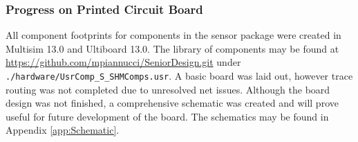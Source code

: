 \subsubsection{Progress on Printed Circuit Board}
All component footprints for components in the sensor package were created in Multisim 13.0 and Ultiboard 13.0.
The library of components may be found at \url{https://github.com/mpiannucci/SeniorDesign.git} under \verb|./hardware/UsrComp_S_SHMComps.usr|.
A basic board was laid out, however trace routing was not completed due to unresolved net issues.
Although the board design was not finished, a comprehensive schematic was created and will prove useful for future development of the board.
The schematics may be found in Appendix \ref{app:Schematic}.